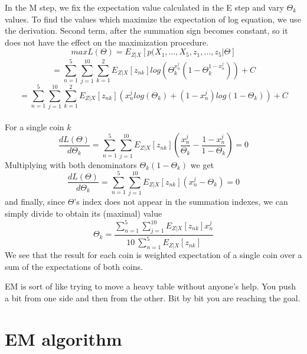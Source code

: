 \documentclass[11pt]{article}
\begin{document}
In the M step, we fix the expectation value calculated in the E step and vary $\Theta_k$ values. To find the values which maximize the expectation of log equation, we use the derivation. Second term, after the summation sign becomes constant, so it does not have the effect on the maximization procedure.
\begin{equation}
maxL(\Theta)=E_{Z|X}[p(X_1,\dots, X_5,{z_1,\dots,z_5}|\Theta]
\end{equation}
\begin{equation}
=\sum_{n=1}^{5}\sum_{j=1}^{10}\sum_{k=1}^{2}E_{Z|X}[z_{nk}]log(\Theta_k^{x_n^j}(1-\Theta_k^{1-x_n^j}))+C
\end{equation}
\begin{equation}
=\sum_{n=1}^{5}\sum_{j=1}^{10}\sum_{k=1}^{2}E_{Z|X}[z_{nk}]({x_n^j}log(\Theta_k)+({1-x_n^j})log(1-\Theta_k))+C
\end{equation}
\\
For a single coin $k$
\begin{equation}
\frac{dL(\Theta)}{d\Theta_k}=\sum_{n=1}^{5}\sum_{j=1}^{10}E_{Z|X}[z_{nk}](\frac{x_n^j}{\Theta_k}-\frac{1-x_n^j}{1-\Theta_k})=0
\end{equation}
Multiplying with both denominators $\Theta_k(1-\Theta_k)$ we get
\begin{equation}
\frac{dL(\Theta)}{d\Theta_k}=\sum_{n=1}^{5}\sum_{j=1}^{10}E_{Z|X}[z_{nk}]({x_n^j}-{\Theta_k})=0
\end{equation}
and finally, since $\Theta$'s index does not appear in the summation indexes, we can simply divide to obtain its (maximal) value
\begin{equation}
\Theta_k=\frac{\sum_{n=1}^{5}\sum_{j=1}^{10}E_{Z|X}[z_{nk}]{x_n^j}}{10\:\sum_{n=1}^{5}E_{Z|X}[z_{nk}]}
\end{equation}
We see that the result for each coin is weighted expectation of a single coin over a sum of the expectations of both coins.

EM is sort of like trying to move a heavy table without anyone's help. You push a bit from one side and then from the other. Bit by bit you are reaching the goal.

\section{EM algorithm}
\end{document}
